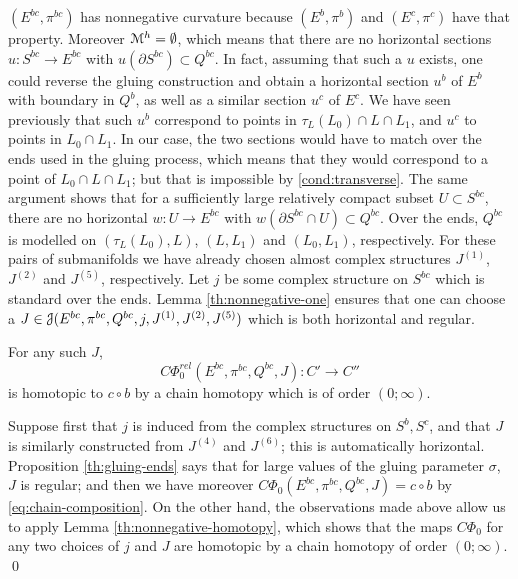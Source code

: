 \documentclass[10pt,letterpaper]{article}
\begin{document}
%
%
$(E^{bc},\pi^{bc})$ has nonnegative curvature because $(E^b,\pi^b)$ and
$(E^c,\pi^c)$ have that property. Moreover $\mathcal{M}^h = \emptyset$, which means
that there are no horizontal sections $u: S^{bc} \rightarrow E^{bc}$ with
$u(\partial S^{bc}) \subset Q^{bc}$. In fact, assuming that such a $u$ exists,
one could reverse the gluing construction and obtain a horizontal section $u^b$
of $E^b$ with boundary in $Q^b$, as well as a similar section $u^c$ of $E^c$.
We have seen previously that such $u^b$ correspond to points in $\tau_L(L_0)
\cap L \cap L_1$, and $u^c$ to points in $L_0 \cap L_1$. In our case, the two
sections would have to match over the ends used in the gluing process, which
means that they would correspond to a point of $L_0 \cap L \cap L_1$; but that
is impossible by \ref{cond:transverse}. The same argument shows that for a
sufficiently large relatively compact subset $U \subset S^{bc}$, there are no
horizontal $w: U \rightarrow E^{bc}$ with $w(\partial S^{bc} \cap U) \subset
Q^{bc}$. Over the ends, $Q^{bc}$ is modelled on $(\tau_L(L_0),L)$, $(L,L_1)$
and $(L_0,L_1)$, respectively. For these pairs of submanifolds we have already
chosen almost complex structures $J^{(1)}$, $J^{(2)}$ and $J^{(5)}$,
respectively. Let $j$ be some complex structure on $S^{bc}$ which is standard
over the ends. Lemma \ref{th:nonnegative-one} ensures that one can choose a $J
\in \mathcal{J}(E^{bc},\pi^{bc},Q^{bc},j,J^{(1)},J^{(2)},J^{(5)})$ which is both
horizontal and regular.

\begin{lemma} \label{th:bc}
For any such $J$,
\[
C\Phi_0^{rel}(E^{bc},\pi^{bc},Q^{bc},J): C' \longrightarrow C''
\]
is homotopic to $c \circ b$ by a chain homotopy which is of order $(0;\infty)$.
\end{lemma}

\proof Suppose first that $j$ is induced from the complex structures on
$S^b,S^c$, and that $J$ is similarly constructed from $J^{(4)}$ and $J^{(6)}$;
this is automatically horizontal. Proposition \ref{th:gluing-ends} says that
for large values of the gluing parameter $\sigma$, $J$ is regular; and then we
have moreover $C\Phi_0(E^{bc},\pi^{bc},Q^{bc},J) = c \circ b$ by
\eqref{eq:chain-composition}. On the other hand, the observations made above
allow us to apply Lemma \ref{th:nonnegative-homotopy}, which shows that the
maps $C\Phi_0$ for any two choices of $j$ and $J$ are homotopic by a chain
homotopy of order $(0;\infty)$. \qed
\end{document}
